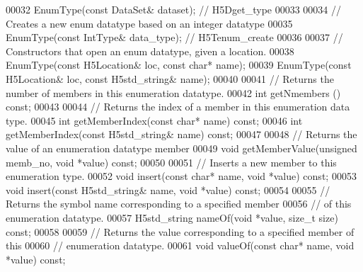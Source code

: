 \begin{DoxyCode}
00032         EnumType(\textcolor{keyword}{const} DataSet& dataset);  \textcolor{comment}{// H5Dget\_type}
00033 
00034         \textcolor{comment}{// Creates a new enum datatype based on an integer datatype}
00035         EnumType(\textcolor{keyword}{const} IntType& data\_type);  \textcolor{comment}{// H5Tenum\_create}
00036 
00037         \textcolor{comment}{// Constructors that open an enum datatype, given a location.}
00038         EnumType(\textcolor{keyword}{const} H5Location& loc, \textcolor{keyword}{const} \textcolor{keywordtype}{char}* name);
00039         EnumType(\textcolor{keyword}{const} H5Location& loc, \textcolor{keyword}{const} H5std\_string& name);
00040 
00041         \textcolor{comment}{// Returns the number of members in this enumeration datatype.}
00042         \textcolor{keywordtype}{int} getNmembers () \textcolor{keyword}{const};
00043 
00044         \textcolor{comment}{// Returns the index of a member in this enumeration data type.}
00045         \textcolor{keywordtype}{int} getMemberIndex(\textcolor{keyword}{const} \textcolor{keywordtype}{char}* name) \textcolor{keyword}{const};
00046         \textcolor{keywordtype}{int} getMemberIndex(\textcolor{keyword}{const} H5std\_string& name) \textcolor{keyword}{const};
00047 
00048         \textcolor{comment}{// Returns the value of an enumeration datatype member}
00049         \textcolor{keywordtype}{void} getMemberValue(\textcolor{keywordtype}{unsigned} memb\_no, \textcolor{keywordtype}{void} *value) \textcolor{keyword}{const};
00050 
00051         \textcolor{comment}{// Inserts a new member to this enumeration type.}
00052         \textcolor{keywordtype}{void} insert(\textcolor{keyword}{const} \textcolor{keywordtype}{char}* name, \textcolor{keywordtype}{void} *value) \textcolor{keyword}{const};
00053         \textcolor{keywordtype}{void} insert(\textcolor{keyword}{const} H5std\_string& name, \textcolor{keywordtype}{void} *value) \textcolor{keyword}{const};
00054 
00055         \textcolor{comment}{// Returns the symbol name corresponding to a specified member}
00056         \textcolor{comment}{// of this enumeration datatype.}
00057         H5std\_string nameOf(\textcolor{keywordtype}{void} *value, \textcolor{keywordtype}{size\_t} size) \textcolor{keyword}{const};
00058 
00059         \textcolor{comment}{// Returns the value corresponding to a specified member of this}
00060         \textcolor{comment}{// enumeration datatype.}
00061         \textcolor{keywordtype}{void} valueOf(\textcolor{keyword}{const} \textcolor{keywordtype}{char}* name, \textcolor{keywordtype}{void} *value) \textcolor{keyword}{const};

\end{DoxyCode}
